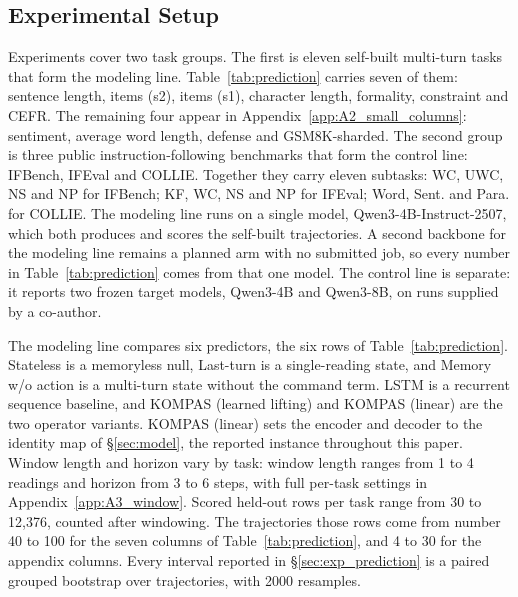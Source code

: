 \subsection{Experimental Setup}
\label{sec:exp_setup}

Experiments cover two task groups.
The first is eleven self-built multi-turn tasks that form the modeling line.  %
Table~\ref{tab:prediction} carries seven of them: sentence length, items (s2), items (s1), character length, formality, constraint and CEFR.  %
The remaining four appear in Appendix~\ref{app:A2_small_columns}: sentiment, average word length, defense and GSM8K-sharded.  %
The second group is three public instruction-following benchmarks that form the control line: IFBench, IFEval and COLLIE.  %
Together they carry eleven subtasks: WC, UWC, NS and NP for IFBench; KF, WC, NS and NP for IFEval; Word, Sent. and Para. for COLLIE.  %
The modeling line runs on a single model, Qwen3-4B-Instruct-2507, which both produces and scores the self-built trajectories.  %
A second backbone for the modeling line remains a planned arm with no submitted job, so every number in Table~\ref{tab:prediction} comes from that one model.  %
The control line is separate: it reports two frozen target models, Qwen3-4B and Qwen3-8B, on runs supplied by a co-author.  %

The modeling line compares six predictors, the six rows of Table~\ref{tab:prediction}.  %
Stateless is a memoryless null, Last-turn is a single-reading state, and Memory w/o action is a multi-turn state without the command term.
LSTM is a recurrent sequence baseline, and KOMPAS (learned lifting) and KOMPAS (linear) are the two operator variants.
KOMPAS (linear) sets the encoder and decoder to the identity map of \S\ref{sec:model}, the reported instance throughout this paper.
Window length and horizon vary by task: window length ranges from 1 to 4 readings and horizon from 3 to 6 steps, with full per-task settings in Appendix~\ref{app:A3_window}.  %
Scored held-out rows per task range from 30 to 12,376, counted after windowing.  %
The trajectories those rows come from number 40 to 100 for the seven columns of Table~\ref{tab:prediction}, and 4 to 30 for the appendix columns.  %
Every interval reported in \S\ref{sec:exp_prediction} is a paired grouped bootstrap over trajectories, with 2000 resamples.  %

